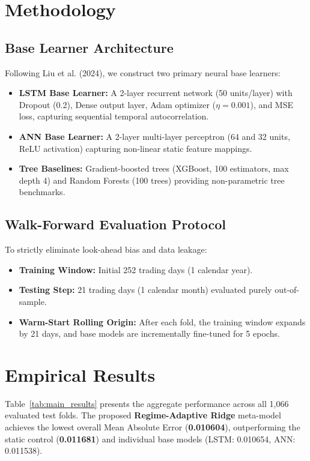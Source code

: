 \documentclass[conference]{IEEEtran}
\begin{document}
\section{Methodology}

\subsection{Base Learner Architecture}
Following Liu et al. (2024), we construct two primary neural base learners:
\begin{itemize}
    \item \textbf{LSTM Base Learner:} A 2-layer recurrent network (50 units/layer) with Dropout (0.2), Dense output layer, Adam optimizer ($\eta = 0.001$), and MSE loss, capturing sequential temporal autocorrelation.
    \item \textbf{ANN Base Learner:} A 2-layer multi-layer perceptron (64 and 32 units, ReLU activation) capturing non-linear static feature mappings.
    \item \textbf{Tree Baselines:} Gradient-boosted trees (XGBoost, 100 estimators, max depth 4) and Random Forests (100 trees) providing non-parametric tree benchmarks.
\end{itemize}

\subsection{Walk-Forward Evaluation Protocol}
To strictly eliminate look-ahead bias and data leakage:
\begin{itemize}
    \item \textbf{Training Window:} Initial 252 trading days (1 calendar year).
    \item \textbf{Testing Step:} 21 trading days (1 calendar month) evaluated purely out-of-sample.
    \item \textbf{Warm-Start Rolling Origin:} After each fold, the training window expands by 21 days, and base models are incrementally fine-tuned for 5 epochs.
\end{itemize}

\section{Empirical Results}



Table~\ref{tab:main_results} presents the aggregate performance across all 1,066 evaluated test folds. The proposed \textbf{Regime-Adaptive Ridge} meta-model achieves the lowest overall Mean Absolute Error (\textbf{0.010604}), outperforming the static control (\textbf{0.011681}) and individual base models (LSTM: 0.010654, ANN: 0.011538).
\end{document}
